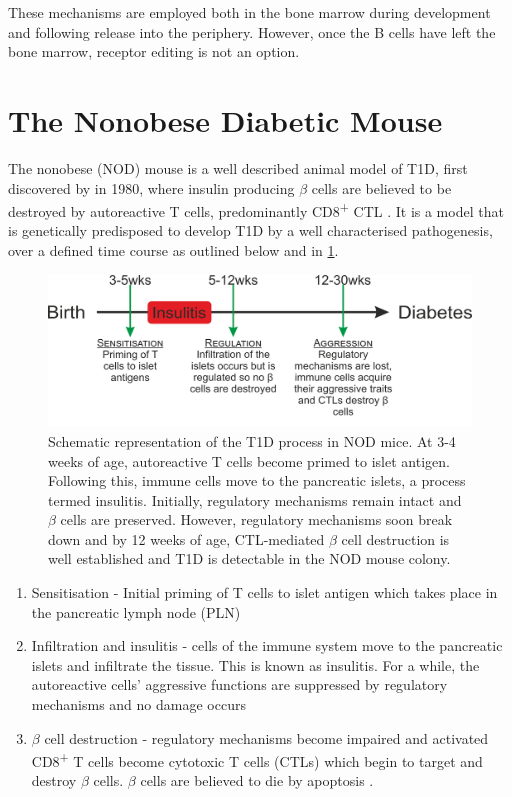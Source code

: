 These mechanisms are employed both in the bone marrow during development and following release into the periphery.
However, once the B cells have left the bone marrow, receptor editing is not an option.



\section{The Nonobese Diabetic Mouse}

The nonobese (NOD) mouse is a well described animal model of T1D, first discovered by \citet{Makino1980} in 1980, where insulin producing $\beta$ cells are believed to be destroyed by autoreactive T cells, predominantly CD8\textsuperscript{+} CTL \citep{Lieberman2003}.
It is a model that is genetically predisposed to develop T1D by a well characterised pathogenesis, over a defined time course as outlined below and in \cref{fig:diseasecourse}.

\begin{figure}
\includegraphics[width=\textwidth]{Figures/NODdisease.png}
\caption[Schematic representation of the T1D process in NOD mice]{Schematic representation of the T1D process in NOD mice. At 3-4 weeks of age, autoreactive T cells become primed to islet antigen. Following this, immune cells move to the pancreatic islets, a process termed insulitis. Initially, regulatory mechanisms remain intact and $\beta$ cells are preserved. However, regulatory mechanisms soon break down and by 12 weeks of age, CTL-mediated $\beta$ cell destruction is well established and T1D is detectable in the NOD mouse colony.}
\label{fig:diseasecourse}
\end{figure}

\begin{enumerate}
\item Sensitisation - Initial priming of T cells to islet antigen which takes place in the pancreatic lymph node (PLN)
\item Infiltration and insulitis - cells of the immune system move to the pancreatic islets and infiltrate the tissue. This is known as insulitis. For a while, the autoreactive cells' aggressive functions are suppressed by regulatory mechanisms and no damage occurs
\item $\beta$ cell destruction - regulatory mechanisms become impaired and activated CD8\textsuperscript{+} T cells become cytotoxic T cells (CTLs) which begin to target and destroy $\beta$ cells. $\beta$ cells are believed to die by apoptosis \citep{Cnop2005}.
\end{enumerate}

